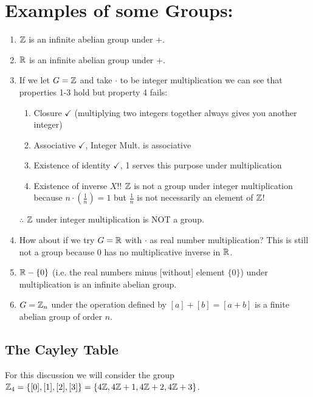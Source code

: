 \section{Examples of some Groups:}
\begin{enumerate}
    \item ${\mathbb{Z}}$ is an infinite abelian group under $+$.
    \item ${\mathbb{R}}$ is an infinite abelian group under $+$.
    \item If we let $G={\mathbb{Z}}$ and take $\cdot$ to be integer multiplication we can see that properties
    1-3 hold but property 4 fails:
    \begin{enumerate}[label=\roman*]
        \item Closure $\checkmark$ (multiplying two integers together always gives you another
        integer)
        \item Associative $\checkmark$, Integer Mult. is associative
        \item Existence of identity $\checkmark$, 1 serves this purpose under multiplication
        \item Existence of inverse $X$!! ${\mathbb{Z}}$ is not a group under integer multiplication because
        $n\cdot (\frac{1}{n})=1$ but $\frac{1}{n}$ is not necessarily an element of ${\mathbb{Z}}$!
    \end{enumerate}
    $\therefore$ ${\mathbb{Z}}$ under integer multiplication is NOT a group.
    \item How about if we try $G={\mathbb{R}}$ with $\cdot$ as real number multiplication? This is still not a
    group because 0 has no multiplicative inverse in ${\mathbb{R}}$.
    \item ${\mathbb{R}}-\{0\}$ (i.e. the real numbers minus [without] element $\{0\}$) under multiplication is
    an infinite abelian group.
    \item $G={\mathbb{Z}}_n$ under the operation defined by $[a]+[b]=[a+b]$ is a finite abelian group of order
    $n$.
\end{enumerate}
\subsection{The Cayley Table}
For this discussion we will consider the group
${\mathbb{Z}}_4=\{[0],[1],[2],[3]\}=\{4{\mathbb{Z}},4{\mathbb{Z}}+1,4{\mathbb{Z}}+2,4{\mathbb{Z}}+3\}$.\steezybreak

